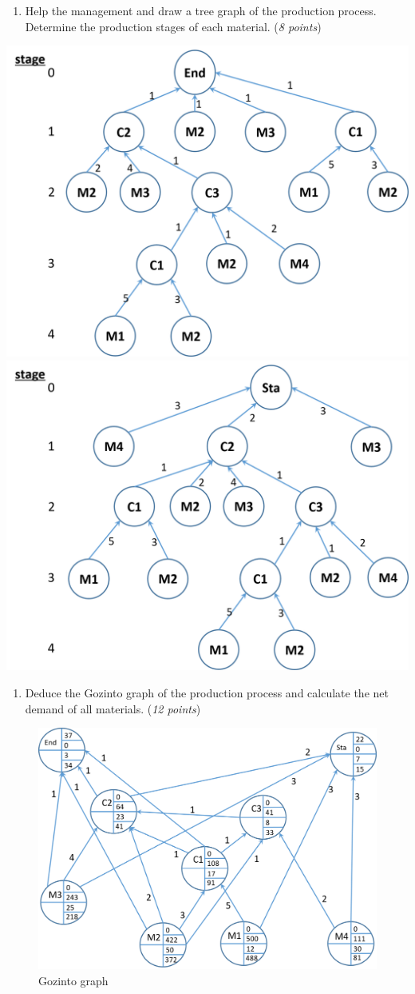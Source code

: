 \documentclass[
]{article}
\providecommand{\tightlist}{%
  \setlength{\itemsep}{0pt}\setlength{\parskip}{0pt}}
\begin{document}
\begin{enumerate}
\def\labelenumi{\arabic{enumi}.}
\tightlist
\item
  Help the management and draw a tree graph of the production process.
  Determine the production stages of each material. (\emph{8 points})
\end{enumerate}

\includegraphics[width=0.49\linewidth]{tree1}
\includegraphics[width=0.49\linewidth]{tree2}

\begin{enumerate}
\def\labelenumi{\arabic{enumi}.}
\setcounter{enumi}{1}
\tightlist
\item
  Deduce the Gozinto graph of the production process and calculate the
  net demand of all materials. (\emph{12 points})
\end{enumerate}

\begin{figure}
\centering
\includegraphics{gozinto.png}
\caption{Gozinto graph}
\end{figure}
\end{document}
